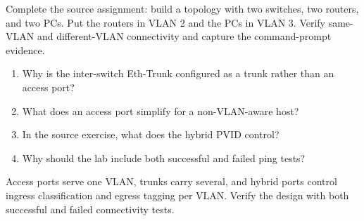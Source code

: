 \begin{tryit}
Complete the source assignment: build a topology with two switches, two routers, and two PCs. Put the routers in VLAN 2 and the PCs in VLAN 3. Verify same-VLAN and different-VLAN connectivity and capture the command-prompt evidence.
\end{tryit}

\begin{quickcheck}
\begin{enumerate}
\item Why is the inter-switch Eth-Trunk configured as a trunk rather than an access port?
\item What does an access port simplify for a non-VLAN-aware host?
\item In the source exercise, what does the hybrid PVID control?
\item Why should the lab include both successful and failed ping tests?
\end{enumerate}
\end{quickcheck}

\begin{chapterrecap}
Access ports serve one VLAN, trunks carry several, and hybrid ports control ingress classification and egress tagging per VLAN. Verify the design with both successful and failed connectivity tests.
\end{chapterrecap}


